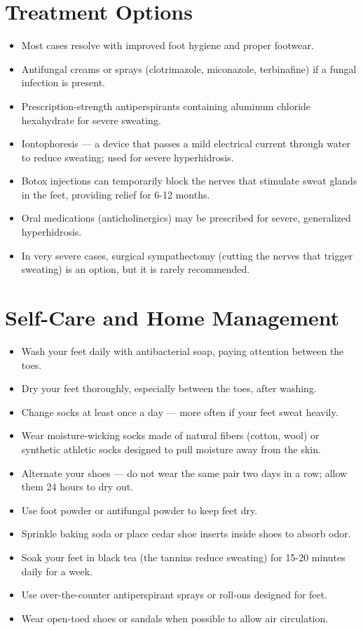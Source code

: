\section*{Treatment Options}
\begin{itemize}
  \item Most cases resolve with improved foot hygiene and proper footwear.
  \item Antifungal creams or sprays (clotrimazole, miconazole, terbinafine) if a fungal infection is present.
  \item Prescription-strength antiperspirants containing aluminum chloride hexahydrate for severe sweating.
  \item Iontophoresis — a device that passes a mild electrical current through water to reduce sweating; used for severe hyperhidrosis.
  \item Botox injections can temporarily block the nerves that stimulate sweat glands in the feet, providing relief for 6-12 months.
  \item Oral medications (anticholinergics) may be prescribed for severe, generalized hyperhidrosis.
  \item In very severe cases, surgical sympathectomy (cutting the nerves that trigger sweating) is an option, but it is rarely recommended.
\end{itemize}

\section*{Self-Care and Home Management}
\begin{itemize}
  \item Wash your feet daily with antibacterial soap, paying attention between the toes.
  \item Dry your feet thoroughly, especially between the toes, after washing.
  \item Change socks at least once a day — more often if your feet sweat heavily.
  \item Wear moisture-wicking socks made of natural fibers (cotton, wool) or synthetic athletic socks designed to pull moisture away from the skin.
  \item Alternate your shoes — do not wear the same pair two days in a row; allow them 24 hours to dry out.
  \item Use foot powder or antifungal powder to keep feet dry.
  \item Sprinkle baking soda or place cedar shoe inserts inside shoes to absorb odor.
  \item Soak your feet in black tea (the tannins reduce sweating) for 15-20 minutes daily for a week.
  \item Use over-the-counter antiperspirant sprays or roll-ons designed for feet.
  \item Wear open-toed shoes or sandals when possible to allow air circulation.
\end{itemize}

